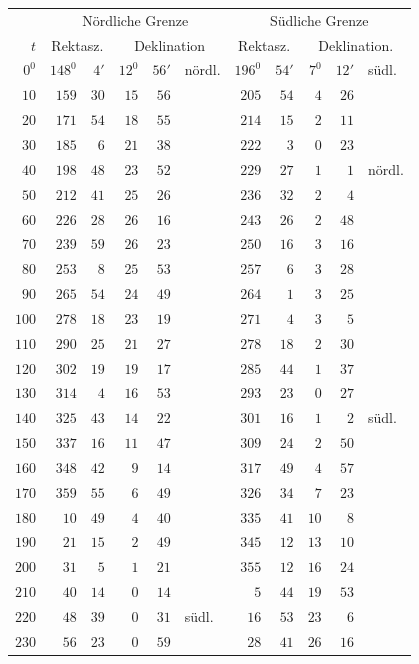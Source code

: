 \begin{center}
\begingroup\small\setlength{\tabcolsep}{5pt}
\begin{tabular}{r||rr|rrl||rr|rrl}
&\multicolumn{5}{c||}{Nördliche Grenze}&\multicolumn{5}{c}{Südliche Grenze}\\
$t$&\multicolumn{2}{c|}{Rektasz.}&\multicolumn{3}{c||}{Deklination}&\multicolumn{2}{c|}{Rektasz.}&\multicolumn{3}{c}{Deklination.}\\\hline
$0^0$&$148^0$&$4'$&$12^0$&$56'$&nördl.&$196^0$&$54'$&$7^0$&$12'$&südl.\\
$10$&$159$&$30$&$15$&$56$&&$205$&$54$&$4$&$26$&\\
$20$&$171$&$54$&$18$&$55$&&$214$&$15$&$2$&$11$&\\
$30$&$185$&$6$&$21$&$38$&&$222$&$3$&$0$&$23$&\\
$40$&$198$&$48$&$23$&$52$&&$229$&$27$&$1$&$1$&nördl.\\
$50$&$212$&$41$&$25$&$26$&&$236$&$32$&$2$&$4$&\\
$60$&$226$&$28$&$26$&$16$&&$243$&$26$&$2$&$48$&\\[3pt]
$70$&$239$&$59$&$26$&$23$&&$250$&$16$&$3$&$16$&\\
$80$&$253$&$8$&$25$&$53$&&$257$&$6$&$3$&$28$&\\
$90$&$265$&$54$&$24$&$49$&&$264$&$1$&$3$&$25$&\\
$100$&$278$&$18$&$23$&$19$&&$271$&$4$&$3$&$5$&\\
$110$&$290$&$25$&$21$&$27$&&$278$&$18$&$2$&$30$&\\
$120$&$302$&$19$&$19$&$17$&&$285$&$44$&$1$&$37$&\\[3pt]
$130$&$314$&$4$&$16$&$53$&&$293$&$23$&$0$&$27$&\\
$140$&$325$&$43$&$14$&$22$&&$301$&$16$&$1$&$2$&südl.\\
$150$&$337$&$16$&$11$&$47$&&$309$&$24$&$2$&$50$&\\
$160$&$348$&$42$&$9$&$14$&&$317$&$49$&$4$&$57$&\\
$170$&$359$&$55$&$6$&$49$&&$326$&$34$&$7$&$23$&\\
$180$&$10$&$49$&$4$&$40$&&$335$&$41$&$10$&$8$&\\[3pt]
$190$&$21$&$15$&$2$&$49$&&$345$&$12$&$13$&$10$&\\
$200$&$31$&$5$&$1$&$21$&&$355$&$12$&$16$&$24$&\\
$210$&$40$&$14$&$0$&$14$&&$5$&$44$&$19$&$53$&\\
$220$&$48$&$39$&$0$&$31$&südl.&$16$&$53$&$23$&$6$&\\
$230$&$56$&$23$&$0$&$59$&&$28$&$41$&$26$&$16$&\\

\end{tabular}
\end{center}

